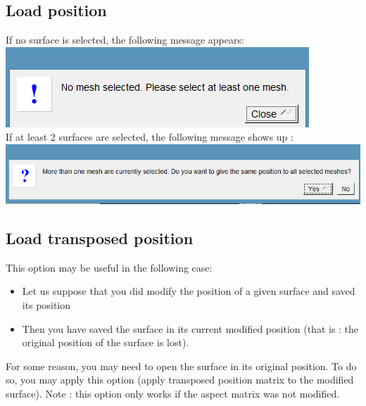 \subsection{Load position}
If no surface is selected, the following message
appears:\\
\includegraphics[scale=0.5]{images/File/open_position1.png}
\\
If at least 2 surfaces are selected, the following message shows up :\\
\includegraphics[scale=0.5]{images/File/open_position2.png}

\subsection{Load transposed position}
This option may be useful in the following case:
\begin{itemize}
\item Let us suppose that you did modify the position of a given surface and saved its position
\item Then you have saved the surface in its current modified position (that is : the original position of the
surface is lost).
\end{itemize}

For some reason, you may need to open the surface in its original position. To do so, you may apply this option (apply transposed position matrix to the modified surface).
Note : this option only works if the aspect matrix was not modified.

